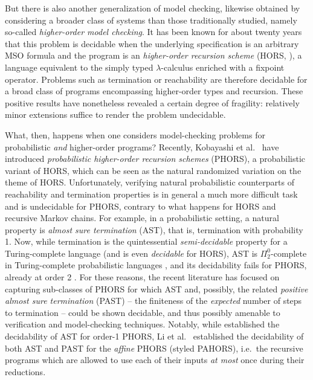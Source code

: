 But there is also another generalization of model checking, likewise obtained by considering a broader class of systems than those traditionally studied, namely so-called \emph{higher-order model checking}. It has been known for about twenty years that this problem is decidable when the underlying specification is an arbitrary MSO formula and the program is an \emph{higher-order recursion scheme} (HORS, \cite{10.1109/LICS.2006.38, DBLP:conf/lics/Ong15}), a language equivalent to the simply typed $\lambda$-calculus enriched with a fixpoint operator. Problems such as termination or reachability are therefore decidable for a broad class of programs encompassing higher-order types and recursion. These positive results have nonetheless revealed
a certain degree of fragility: relatively minor extensions suffice to render the problem undecidable.

What, then, happens when one considers model-checking problems for probabilistic \emph{and} higher-order programs? Recently, Kobayashi et al.~\cite{DBLP:journals/lmcs/KobayashiLG20} have introduced \emph{probabilistic higher-order recursion schemes} (PHORS), a probabilistic variant of HORS, which can be seen as the natural randomized variation on the theme of HORS. Unfortunately, verifying natural probabilistic counterparts of reachability and termination properties is in general a much more difficult task and is undecidable for PHORS, contrary to what happens for HORS and recursive Markov chains. For example, in a probabilistic setting, a natural property is \emph{almost sure termination} (AST), that is, termination with probability 1. Now, while termination is the quintessential \emph{semi-decidable} property for a Turing-complete language (and is even \emph{decidable} for HORS),  AST is $\Pi^0_2$-complete in Turing-complete probabilistic languages \cite{DBLP:journals/acta/KaminskiKM19}, and its decidability fails for PHORS, already at order 2 \cite{DBLP:journals/lmcs/KobayashiLG20}. For these reasons, the recent literature has focused on capturing sub-classes of PHORS for which AST and, possibly, the related \emph{positive almost sure termination} (PAST) -- the finiteness of the \emph{expected} number of steps to termination -- could be shown decidable, and thus possibly amenable to verification and model-checking techniques. Notably, while \cite{DBLP:journals/lmcs/KobayashiLG20} established the decidability of AST for order-1 PHORS, Li et al.~\cite{DBLP:conf/lics/LiMO22} established the decidability of both AST and PAST for the \emph{affine} PHORS (styled PAHORS), i.e.~the recursive programs which are allowed to use each of their inputs \emph{at most} once during their reductions.

